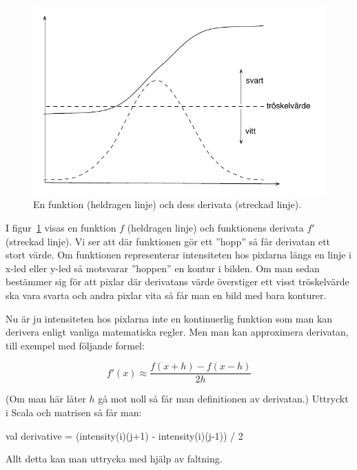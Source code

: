 \begin{figure}[H]
\includegraphics[width=\textwidth]{../img/w13-assignment-imageprocessing/derivatabild2.pdf}
\caption { En funktion (heldragen linje) och dess derivata (streckad linje).}
\label{fig:derivatabild}
\end{figure}

I figur~\ref{fig:derivatabild} visas en funktion $f$ (heldragen linje) och funktionens derivata $f'$ (streckad linje). Vi ser att där funktionen gör ett ''hopp'' så får derivatan ett stort värde. Om funktionen representerar intensiteten hos pixlarna längs en linje i x-led eller y-led så motsvarar ''hoppen'' en kontur i bilden. Om man sedan bestämmer sig för att pixlar där derivatans värde överstiger ett visst tröskelvärde ska vara svarta och andra pixlar vita så får man en bild med bara konturer. 

Nu är ju intensiteten hos pixlarna inte en kontinuerlig funktion som man kan derivera enligt vanliga matematiska regler. Men man kan approximera derivatan, till exempel med följande formel:

\begin{displaymath}
f'(x) \approx \frac{f(x+h) - f(x-h)}{2h}
\end{displaymath}

(Om man här låter $h$ gå mot noll så får man definitionen av derivatan.) Uttryckt i Scala och matrisen  så får man:

\begin{Code}
val derivative = (intensity(i)(j+1) - intensity(i)(j-1)) / 2
\end{Code}

Allt detta kan man uttrycka med hjälp av faltning. 

